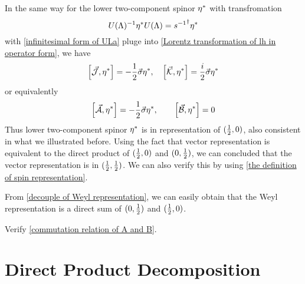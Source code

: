 In the same way for the lower two-component spinor ${\eta^*}$ with transfromation
\begin{equation} \label{Lorentz transformation of lh in operator form}
U(\Lambda)^{-1}{\eta^*} U(\Lambda) = {s^{-1}}^{\dagger} {\eta^*}
\end{equation}
with \eqref{infinitesimal form of ULa} pluge into \eqref{Lorentz transformation of lh in operator form}, we have
\begin{equation}
  \comm{\vec{\mathcal{J}}}{\lh}=-\half\vec{\s}\lh,\quad
\comm{\vec{\mathcal{K}}}{\lh} = \frac{i}{2}\vec{\s}\lh
\end{equation}
or equivalently
\begin{equation}
  \comm{\vec{\mathcal{A}}}{\lh} = -\half \vec{\s}\lh,\qquad
\comm{\vec{\mathcal{B}}}{\lh} =0
\end{equation}
Thus lower two-component spinor ${\eta^*}$ is in representation of $(\frac{1}{2},0)$, also consistent in what we illustrated before.
Using the fact that vector representation is equivalent to the direct product of $(\frac{1}{2},0)$ and $(0,\frac{1}{2})$, we can concluded that the vector representation is in $(\frac{1}{2},\frac{1}{2})$. We can also verify this by using \eqref{the definition of spin representation}.

From \eqref{decouple of Weyl representation}, we can easily obtain that the Weyl representation is a direct sum of $(0,\frac{1}{2})$ and $(\frac{1}{2},0)$. 


\begin{Exe}
Verify \eqref{commutation relation of A and B}.
\end{Exe}

\section{Direct Product Decomposition}

